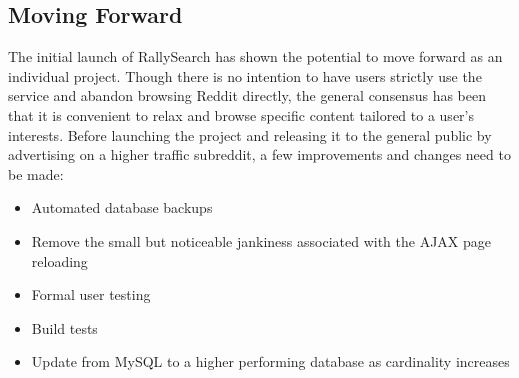 \documentclass[msc,oneside]{ubcthesis}%
\begin{document}
\subsection{Moving Forward}
The initial launch of RallySearch has shown the potential to move forward as an individual project. Though there is no intention to have users strictly use the service and abandon browsing Reddit directly, the general consensus has been that it is convenient to relax and browse specific content tailored to a user's interests. Before launching the project and releasing it to the general public by advertising on a higher traffic subreddit, a few improvements and changes need to be made:
\begin{itemize}
\item{Automated database backups}
\item{Remove the small but noticeable jankiness associated with the AJAX page reloading}
\item{Formal user testing}
\item{Build tests}
\item{Update from MySQL to a higher performing database as cardinality increases}
\end{itemize}

\newpage %
\pagestyle{fancy}\rhead{}\cfoot{}\rfoot{\thepage}

\end{document}
